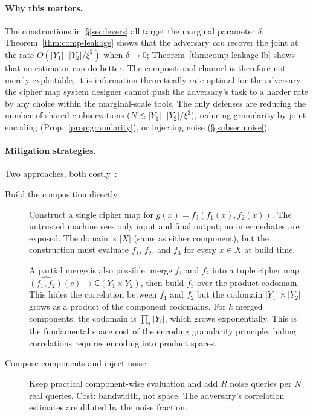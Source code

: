 \documentclass[conference]{IEEEtran}
\theoremstyle{definition}
\theoremstyle{plain}
\theoremstyle{remark}
\newcommand{\fhat}{\hat{f}}
\newcommand{\cipher}[1]{\mathsf{C}(#1)}
\begin{document}
\paragraph{Why this matters.}
The constructions in~\S\ref{sec:levers} all target the marginal
parameter $\delta$.  Theorem~\ref{thm:comp-leakage} shows that the
adversary \emph{can} recover the joint at the rate
$O(|Y_1|\cdot|Y_2|/\xi^2)$ when $\delta \to 0$;
Theorem~\ref{thm:comp-leakage-lb} shows that no estimator can do
better.  The compositional channel is therefore not merely
exploitable, it is information-theoretically rate-optimal for the
adversary: the cipher map system designer cannot push the adversary's
task to a harder rate by any choice within the marginal-scale tools.
The only defenses are reducing the number of shared-$c$ observations
($N \lesssim |Y_1|\cdot|Y_2|/\xi^2$), reducing granularity by joint
encoding (Prop.~\ref{prop:granularity}), or injecting noise
(\S\ref{subsec:noise}).

\paragraph{Mitigation strategies.}
Two approaches, both costly~\cite[Sec.~8.2]{towell2026cipher}:

\begin{description}
\item[Build the composition directly.]  Construct a single cipher map for
  $g(x) = f_3(f_1(x), f_2(x))$.  The untrusted machine sees only
  input and final output; no intermediates are exposed.  The domain is
  $|X|$ (same as either component), but the construction must evaluate
  $f_1$, $f_2$, and $f_3$ for every $x \in X$ at build time.

  A partial merge is also possible: merge $f_1$ and $f_2$ into a tuple
  cipher map $\widehat{(f_1, f_2)}(c) \to \cipher{Y_1 \times Y_2}$,
  then build $\fhat_3$ over the product codomain.
  This hides the correlation between $f_1$ and $f_2$ but the codomain
  $|Y_1| \times |Y_2|$ grows as a product of the component codomains.
  For $k$ merged components, the codomain is $\prod_i |Y_i|$, which
  grows exponentially.
  This is the fundamental space cost of the encoding granularity
  principle: hiding correlations requires encoding into product spaces.

\item[Compose components and inject noise.]  Keep practical
  component-wise evaluation and add $R$ noise queries per $N$ real
  queries.  Cost: bandwidth, not space.  The adversary's correlation
  estimates are diluted by the noise fraction.
\end{description}
\end{document}
